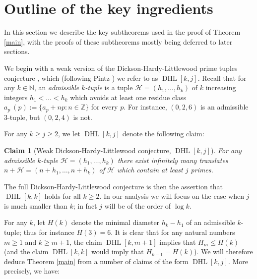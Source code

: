 \documentclass{bmcart}
\DeclareMathOperator*\DHL{DHL}
\theoremstyle{plain}
\newtheorem{claim}[theorem]{Claim}
\theoremstyle{definition}
\newcommand\Z{\mathbb{Z}}
\begin{document}

\section{Outline of the key ingredients}\label{subclaim-sec}

In this section we describe the key subtheorems used in the proof of Theorem \ref{main}, with the proofs of these subtheorems mostly being deferred to later sections.

We begin with a weak version of the Dickson-Hardy-Littlewood prime tuples conjecture \cite{hardy}, which (following Pintz \cite{pintz-polignac}) we refer to as $\DHL[k,j]$.  Recall that for any $k \in \mathbb{N}$, an \emph{admissible $k$-tuple} is a tuple ${\mathcal H} = (h_1,\ldots,h_{k})$ of $k$ increasing integers $h_1 < \ldots < h_{k}$ which avoids at least one residue class $a_p\ (p) := \{ a_p + np: n \in \Z \}$ for every $p$.  For instance, $(0,2,6)$ is an admissible $3$-tuple, but $(0,2,4)$ is not.

For any $k \geq j \geq 2$, we let $\DHL[k,j]$ denote the following claim:

\begin{claim}[Weak Dickson-Hardy-Littlewood conjecture,
  {$\DHL[k,j]$}] For any admissible $k$-tuple ${\mathcal
    H}=(h_1,\ldots,h_{k})$ there
  exist infinitely many translates $n + {\mathcal H} =
  (n+h_1,\ldots,n+h_{k})$ of ${\mathcal H}$ which contain at least $j$
  primes.
\end{claim}

The full Dickson-Hardy-Littlewood conjecture is then the assertion that $\DHL[k,k]$ holds for all $k \ge 2$.  In our analysis we will focus on the case when $j$ is much smaller than $k$; in fact $j$ will be of the order of $\log k$.

For any $k$, let $H(k)$ denote the minimal diameter $h_k-h_1$ of an admissible $k$-tuple; thus for instance $H(3)=6$.  It is clear that for any natural numbers $m \geq 1$ and $k \geq m+1$, the claim $\DHL[k,m+1]$ implies that $H_m \leq H(k)$ (and the claim $\DHL[k,k]$ would imply that $H_{k-1} = H(k)$).  We will therefore deduce Theorem \ref{main} from a number of claims of the form $\DHL[k,j]$.  More precisely, we have:
\end{document}
